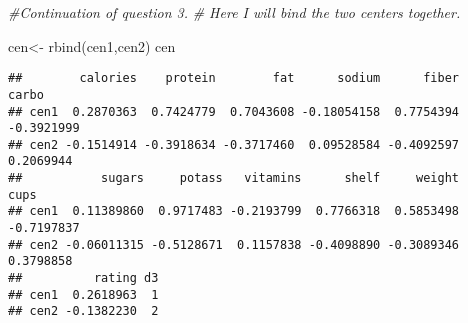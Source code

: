 \documentclass[
]{article}
\newenvironment{Shaded}{\begin{snugshade}}{\end{snugshade}}
\newcommand{\CommentTok}[1]{\textcolor[rgb]{0.56,0.35,0.01}{\textit{#1}}}
\newcommand{\DecValTok}[1]{\textcolor[rgb]{0.00,0.00,0.81}{#1}}
\newcommand{\FunctionTok}[1]{\textcolor[rgb]{0.00,0.00,0.00}{#1}}
\newcommand{\NormalTok}[1]{#1}
\newcommand{\OtherTok}[1]{\textcolor[rgb]{0.56,0.35,0.01}{#1}}
\newcommand{\SpecialCharTok}[1]{\textcolor[rgb]{0.00,0.00,0.00}{#1}}
\begin{document}
\begin{Shaded}
\end{Shaded}

\begin{Shaded}
\begin{Highlighting}[]
\CommentTok{\#Continuation of question 3. }
\CommentTok{\# Here I will bind the two centers together. }

\NormalTok{cen}\OtherTok{\textless{}{-}} \FunctionTok{rbind}\NormalTok{(cen1,cen2)}
\NormalTok{cen}
\end{Highlighting}
\end{Shaded}

\begin{verbatim}
##        calories    protein        fat      sodium      fiber      carbo
## cen1  0.2870363  0.7424779  0.7043608 -0.18054158  0.7754394 -0.3921999
## cen2 -0.1514914 -0.3918634 -0.3717460  0.09528584 -0.4092597  0.2069944
##           sugars     potass   vitamins      shelf     weight       cups
## cen1  0.11389860  0.9717483 -0.2193799  0.7766318  0.5853498 -0.7197837
## cen2 -0.06011315 -0.5128671  0.1157838 -0.4098890 -0.3089346  0.3798858
##          rating d3
## cen1  0.2618963  1
## cen2 -0.1382230  2
\end{verbatim}
\end{document}
